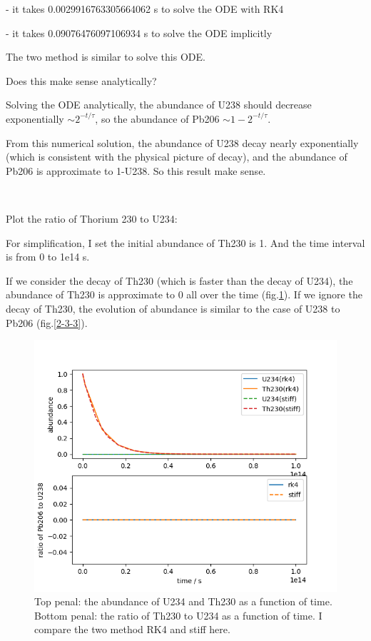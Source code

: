 \documentclass[showpacs, oneside, onecolumn, prl, amsmath, amssymb, nofootinbib, superscriptaddress, notitlepage]{revtex4-1}
\newcommand\bfig{\begin{figure}}
\newcommand\efig{\end{figure}}
\begin{document}
- it takes  0.0029916763305664062 s to solve the ODE with RK4

- it takes  0.09076476097106934 s to solve the ODE implicitly

The two method is similar to solve this ODE.

Does this make sense analytically?

Solving the ODE analytically, the abundance of U238 should decrease exponentially $\sim 2^{-t/\tau}$, so the abundance of Pb206 $\sim 1-2^{-t/\tau}$.

From this numerical solution, the abundance of U238 decay nearly exponentially (which is consistent with the physical picture of decay), and the abundance of Pb206 is approximate to 1-U238. So this result make sense.

~~~~

Plot the ratio of Thorium 230 to U234:

For simplification, I set the initial abundance of Th230 is 1. And the time interval is from 0 to 1e14 s.

 If we consider the decay of Th230 (which is faster than the decay of U234), the abundance of Th230 is approximate to 0 all over the time (fig.\ref{2-3-2}). If we ignore the decay of Th230, the evolution of abundance is similar to the case of U238 to Pb206 (fig.\ref{2-3-3}).

\bfig
	\centering
	\includegraphics[scale=1]{2-3-2.png}
	\caption{Top penal: the abundance of U234 and Th230 as a function of time. Bottom penal: the ratio of Th230 to U234 as a function of time. I compare the two method RK4 and stiff here.}
	\label{2-3-2}
\efig
\end{document}
